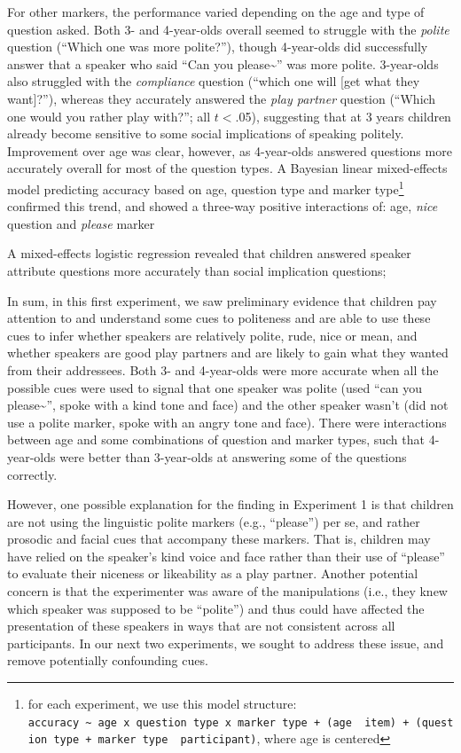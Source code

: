 \documentclass[10pt, letterpaper]{article}
\begin{document}
For other markers, the performance varied depending on the age and type
of question asked. Both 3- and 4-year-olds overall seemed to struggle
with the \emph{polite} question (``Which one was more polite?''), though
4-year-olds did successfully answer that a speaker who said ``Can you
please\textasciitilde{}'' was more polite. 3-year-olds also struggled
with the \emph{compliance} question (``which one will {[}get what they
want{]}?''), whereas they accurately answered the \emph{play partner}
question (``Which one would you rather play with?''; all \(t<\).05),
suggesting that at 3 years children already become sensitive to some
social implications of speaking politely. Improvement over age was
clear, however, as 4-year-olds answered questions more accurately
overall for most of the question types. A Bayesian linear mixed-effects
model predicting accuracy based on age, question type and marker
type\footnote{for each experiment, we use this model structure:
  \texttt{accuracy\ \textasciitilde{}\ age\ x\ question\ type\ x\ marker\ type\ +\ (age\ \textbar{}\ item)\ +\ (question\ type\ +\ marker\ type\ \textbar{}\ participant)},
  where age is centered} confirmed this trend, and showed a three-way
positive interactions of: age, \emph{nice} question and \emph{please}
marker

A mixed-effects logistic regression revealed that children answered
speaker attribute questions more accurately than social implication
questions;

In sum, in this first experiment, we saw preliminary evidence that
children pay attention to and understand some cues to politeness and are
able to use these cues to infer whether speakers are relatively polite,
rude, nice or mean, and whether speakers are good play partners and are
likely to gain what they wanted from their addressees. Both 3- and
4-year-olds were more accurate when all the possible cues were used to
signal that one speaker was polite (used ``can you
please\textasciitilde{}'', spoke with a kind tone and face) and the
other speaker wasn't (did not use a polite marker, spoke with an angry
tone and face). There were interactions between age and some
combinations of question and marker types, such that 4-year-olds were
better than 3-year-olds at answering some of the questions correctly.

However, one possible explanation for the finding in Experiment 1 is
that children are not using the linguistic polite markers (e.g.,
``please'') per se, and rather prosodic and facial cues that accompany
these markers. That is, children may have relied on the speaker's kind
voice and face rather than their use of ``please'' to evaluate their
niceness or likeability as a play partner. Another potential concern is
that the experimenter was aware of the manipulations (i.e., they knew
which speaker was supposed to be ``polite'') and thus could have
affected the presentation of these speakers in ways that are not
consistent across all participants. In our next two experiments, we
sought to address these issue, and remove potentially confounding cues.
\end{document}
